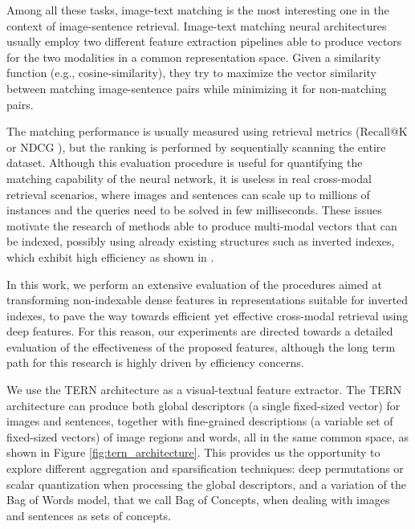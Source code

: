 \documentclass[conference]{IEEEtran}
\begin{document}
Among all these tasks, image-text matching is the most interesting one in the context of image-sentence retrieval. Image-text matching neural architectures usually employ two different feature extraction pipelines able to produce vectors for the two modalities in a common representation space. Given a similarity function (e.g., cosine-similarity), they try to maximize the vector similarity between matching image-sentence pairs while minimizing it for non-matching pairs.

The matching performance is usually measured using retrieval metrics (Recall@K \cite{vsepp2018faghri,li2019,lu2019vilbert,lee2019} or NDCG \cite{carrara2018pictureit,messina2020transformer}), but the ranking is performed by sequentially scanning the entire dataset. Although this evaluation procedure is useful for quantifying the matching capability of the neural network, it is useless in real cross-modal retrieval scenarios, where images and sentences can scale up to millions of instances and the queries need to be solved in few milliseconds.
These issues motivate the research of methods able to produce multi-modal vectors that can be indexed, possibly using already existing structures such as inverted indexes, which exhibit high efficiency as shown in \cite{amato2014mifile}.

In this work, we perform an extensive evaluation of the procedures aimed at transforming non-indexable dense features in representations suitable for inverted indexes, to pave the way towards efficient yet effective cross-modal retrieval using deep features. For this reason, our experiments are directed towards a detailed evaluation of the effectiveness of the proposed features, although the long term path for this research is highly driven by efficiency concerns.

We use the TERN \cite{messina2020transformer} architecture as a visual-textual feature extractor. The TERN architecture can produce both global descriptors (a single fixed-sized vector) for images and sentences, together with fine-grained descriptions (a variable set of fixed-sized vectors) of image regions and words, all in the same common space, as shown in Figure \ref{fig:tern_architecture}. This provides us the opportunity to explore different aggregation and sparsification techniques: deep permutations \cite{amato2016deeppermutations} or scalar quantization \cite{amato2019large} when processing the global descriptors, and a variation of the Bag of Words model, that we call Bag of Concepts, when dealing with images and sentences as sets of concepts.
\end{document}
